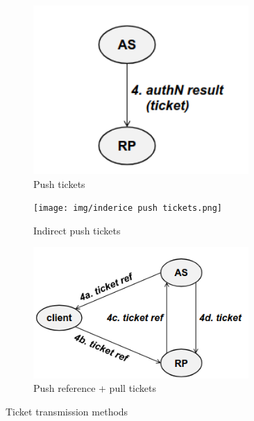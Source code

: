 \begin{figure}[H]
  \centering
  \begin{subfigure}{.3\textwidth}
    \centering
    \includegraphics[width=0.9\textwidth]{img/push tickets.png}
    \caption{Push tickets}
    \label{fig:push-tickets}
  \end{subfigure}
  \begin{subfigure}{.3\textwidth}
    \centering
    \texttt{[image: img/inderice push
    tickets.png]}
    \caption{Indirect push tickets}
    \label{fig:inderice push tickets}
  \end{subfigure}
  \begin{subfigure}{.3\textwidth}
    \centering
    \includegraphics[width=0.9\textwidth]{img/pull ticket.png}
    \caption{Push reference + pull tickets}
    \label{fig:push reference + pull tickets}
  \end{subfigure}
  \caption{Ticket transmission methods}
\end{figure}

